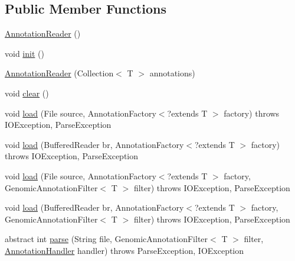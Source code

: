 \subsection*{Public Member Functions}
\begin{DoxyCompactItemize}
\item 
\hyperlink{classbroad_1_1core_1_1annotation_1_1_annotation_reader_3_01_t_01extends_01_genomic_annotation_01_4_adc7b77cf9681958941014c7b460dbb9f}{Annotation\+Reader} ()
\item 
void \hyperlink{classbroad_1_1core_1_1annotation_1_1_annotation_reader_3_01_t_01extends_01_genomic_annotation_01_4_a427f36c6a67ff8ce3dbd1072478faaeb}{init} ()
\item 
\hyperlink{classbroad_1_1core_1_1annotation_1_1_annotation_reader_3_01_t_01extends_01_genomic_annotation_01_4_a2550e162745ea91301b3c2a62603ba31}{Annotation\+Reader} (Collection$<$ T $>$ annotations)
\item 
void \hyperlink{classbroad_1_1core_1_1annotation_1_1_annotation_reader_3_01_t_01extends_01_genomic_annotation_01_4_ab5bc07ea8ca501a2279d52841e8c8d64}{clear} ()
\item 
void \hyperlink{classbroad_1_1core_1_1annotation_1_1_annotation_reader_3_01_t_01extends_01_genomic_annotation_01_4_aa50ace24af6a3ccf8cc7ff486e1adaf9}{load} (File source, Annotation\+Factory$<$?extends T $>$ factory)  throws I\+O\+Exception, Parse\+Exception
\item 
void \hyperlink{classbroad_1_1core_1_1annotation_1_1_annotation_reader_3_01_t_01extends_01_genomic_annotation_01_4_a7f6f003687f218c6e64ed8199688b598}{load} (Buffered\+Reader br, Annotation\+Factory$<$?extends T $>$ factory)  throws I\+O\+Exception, Parse\+Exception
\item 
void \hyperlink{classbroad_1_1core_1_1annotation_1_1_annotation_reader_3_01_t_01extends_01_genomic_annotation_01_4_a82d494fcfdaa6231ef2deb07c0481873}{load} (File source, Annotation\+Factory$<$?extends T $>$ factory, Genomic\+Annotation\+Filter$<$ T $>$ filter)  throws I\+O\+Exception, Parse\+Exception
\item 
void \hyperlink{classbroad_1_1core_1_1annotation_1_1_annotation_reader_3_01_t_01extends_01_genomic_annotation_01_4_a3ea177347b113f59c343d4c91ea35fd7}{load} (Buffered\+Reader br, Annotation\+Factory$<$?extends T $>$ factory, Genomic\+Annotation\+Filter$<$ T $>$ filter)  throws I\+O\+Exception, Parse\+Exception
\item 
abstract int \hyperlink{classbroad_1_1core_1_1annotation_1_1_annotation_reader_3_01_t_01extends_01_genomic_annotation_01_4_a521994585ff85b17fa34c68495a8e902}{parse} (String file, Genomic\+Annotation\+Filter$<$ T $>$ filter, \hyperlink{interfacebroad_1_1core_1_1annotation_1_1_annotation_handler}{Annotation\+Handler} handler)  throws Parse\+Exception, I\+O\+Exception

\end{DoxyCompactItemize}
